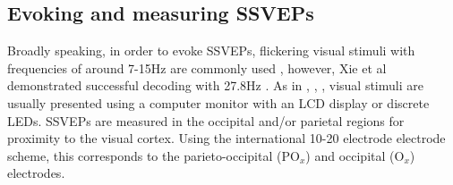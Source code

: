 \subsection{Evoking and measuring SSVEPs}

Broadly speaking, in order to evoke SSVEPs, flickering visual stimuli with frequencies of around 7-15Hz are commonly used \cite{Acampora2021}\cite{Chen2017}\cite{duart-comparing-ssvep-stimuli}, however, Xie et al demonstrated successful decoding with 27.8Hz \cite{Xie2016}. As in \cite{Acampora2021}, \cite{Chen2017}, \cite{autthasan-single-chan-ssvep}, visual stimuli are usually presented using a computer monitor with an LCD display or discrete LEDs. SSVEPs are measured in the occipital and/or parietal regions \cite{Fernandez-Fraga2016} for proximity to the visual cortex. Using the international 10-20 electrode electrode scheme, this corresponds to the parieto-occipital ($\text{PO}_x$) and occipital ($\text{O}_x$)  electrodes.

